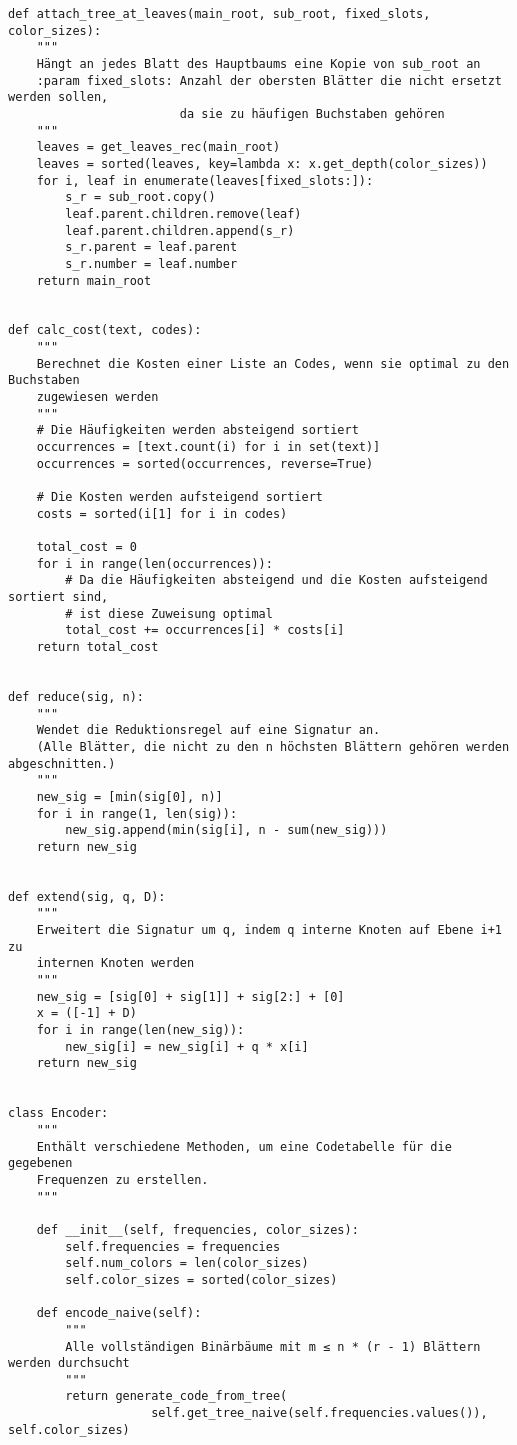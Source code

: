\documentclass[a4paper,10pt,ngerman]{scrartcl}
\begin{document}
\begin{verbatim}
def attach_tree_at_leaves(main_root, sub_root, fixed_slots, color_sizes):
    """
    Hängt an jedes Blatt des Hauptbaums eine Kopie von sub_root an
    :param fixed_slots: Anzahl der obersten Blätter die nicht ersetzt werden sollen,
                        da sie zu häufigen Buchstaben gehören
    """
    leaves = get_leaves_rec(main_root)
    leaves = sorted(leaves, key=lambda x: x.get_depth(color_sizes))
    for i, leaf in enumerate(leaves[fixed_slots:]):
        s_r = sub_root.copy()
        leaf.parent.children.remove(leaf)
        leaf.parent.children.append(s_r)
        s_r.parent = leaf.parent
        s_r.number = leaf.number
    return main_root


def calc_cost(text, codes):
    """
    Berechnet die Kosten einer Liste an Codes, wenn sie optimal zu den Buchstaben
    zugewiesen werden
    """
    # Die Häufigkeiten werden absteigend sortiert
    occurrences = [text.count(i) for i in set(text)]
    occurrences = sorted(occurrences, reverse=True)

    # Die Kosten werden aufsteigend sortiert
    costs = sorted(i[1] for i in codes)

    total_cost = 0
    for i in range(len(occurrences)):
        # Da die Häufigkeiten absteigend und die Kosten aufsteigend sortiert sind,
        # ist diese Zuweisung optimal
        total_cost += occurrences[i] * costs[i]
    return total_cost


def reduce(sig, n):
    """
    Wendet die Reduktionsregel auf eine Signatur an.
    (Alle Blätter, die nicht zu den n höchsten Blättern gehören werden abgeschnitten.)
    """
    new_sig = [min(sig[0], n)]
    for i in range(1, len(sig)):
        new_sig.append(min(sig[i], n - sum(new_sig)))
    return new_sig


def extend(sig, q, D):
    """
    Erweitert die Signatur um q, indem q interne Knoten auf Ebene i+1 zu
    internen Knoten werden
    """
    new_sig = [sig[0] + sig[1]] + sig[2:] + [0]
    x = ([-1] + D)
    for i in range(len(new_sig)):
        new_sig[i] = new_sig[i] + q * x[i]
    return new_sig


class Encoder:
    """
    Enthält verschiedene Methoden, um eine Codetabelle für die gegebenen
    Frequenzen zu erstellen.
    """

    def __init__(self, frequencies, color_sizes):
        self.frequencies = frequencies
        self.num_colors = len(color_sizes)
        self.color_sizes = sorted(color_sizes)

    def encode_naive(self):
        """
        Alle vollständigen Binärbäume mit m ≤ n * (r - 1) Blättern werden durchsucht
        """
        return generate_code_from_tree(
                    self.get_tree_naive(self.frequencies.values()), self.color_sizes)


\end{verbatim}
\end{document}
